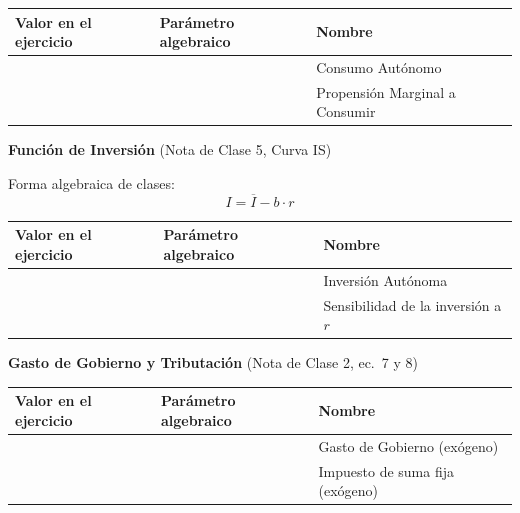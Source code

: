 \documentclass[11pt,a4paper]{article}
\newcommand{\barvar}[1]{\overline{#1}}
\begin{document}
\begin{center}
\renewcommand{\arraystretch}{1.6}
\begin{tabular}{|>{\centering\arraybackslash}m{3cm}|>{\centering\arraybackslash}m{3.5cm}|>{\centering\arraybackslash}m{5cm}|}
    \hline
    \rowcolor{grisclaro}
    \textbf{Valor en el ejercicio} & \textbf{Par\'{a}metro algebraico} & \textbf{Nombre} \\
    \hline
    & & Consumo Aut\'{o}nomo \\
    \hline
    & & Propensi\'{o}n Marginal a Consumir \\
    \hline
\end{tabular}
\end{center}

\vspace{0.5cm}

\noindent\textbf{Funci\'{o}n de Inversi\'{o}n} \hfill \textcolor{grismedio}{\small (Nota de Clase 5, Curva IS)}

\vspace{0.1cm}
\noindent Forma algebraica de clases:
\[
    I = \barvar{I} - b \cdot r
\]

\begin{center}
\renewcommand{\arraystretch}{1.6}
\begin{tabular}{|>{\centering\arraybackslash}m{3cm}|>{\centering\arraybackslash}m{3.5cm}|>{\centering\arraybackslash}m{5cm}|}
    \hline
    \rowcolor{grisclaro}
    \textbf{Valor en el ejercicio} & \textbf{Par\'{a}metro algebraico} & \textbf{Nombre} \\
    \hline
    & & Inversi\'{o}n Aut\'{o}noma \\
    \hline
    & & Sensibilidad de la inversi\'{o}n a $r$ \\
    \hline
\end{tabular}
\end{center}

\vspace{0.5cm}

\noindent\textbf{Gasto de Gobierno y Tributaci\'{o}n} \hfill \textcolor{grismedio}{\small (Nota de Clase 2, ec.\ 7 y 8)}

\begin{center}
\renewcommand{\arraystretch}{1.6}
\begin{tabular}{|>{\centering\arraybackslash}m{3cm}|>{\centering\arraybackslash}m{3.5cm}|>{\centering\arraybackslash}m{5cm}|}
    \hline
    \rowcolor{grisclaro}
    \textbf{Valor en el ejercicio} & \textbf{Par\'{a}metro algebraico} & \textbf{Nombre} \\
    \hline
    & & Gasto de Gobierno (ex\'{o}geno) \\
    \hline
    & & Impuesto de suma fija (ex\'{o}geno) \\
    \hline
\end{tabular}
\end{center}
\end{document}
